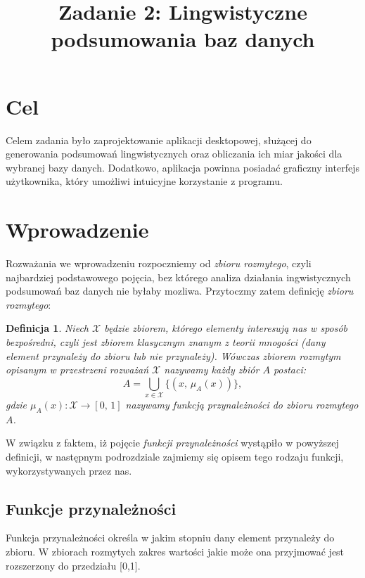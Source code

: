 \documentclass{classrep}
\author{
\studentinfo{Mateusz Walczak}{216911} \and
\studentinfo{Konrad Kajszczak}{216790}
}
\title{Zadanie 2: Lingwistyczne podsumowania baz danych}
\newtheorem{definition}{Definicja}
\begin{document}
\maketitle

\section{Cel}
Celem zadania było zaprojektowanie aplikacji desktopowej, służącej do generowania podsumowań lingwistycznych oraz obliczania ich miar jakości dla wybranej bazy danych. Dodatkowo, aplikacja powinna posiadać graficzny interfejs użytkownika, który umożliwi intuicyjne korzystanie z programu.


\section{Wprowadzenie}
Rozważania we wprowadzeniu rozpoczniemy od \emph{zbioru rozmytego}, czyli najbardziej podstawowego pojęcia, bez którego analiza działania ingwistycznych podsumowań baz danych nie byłaby mozliwa. Przytoczmy zatem definicję \emph{zbioru rozmytego}:

\begin{definition}
Niech \(\mathcal{X}\) będzie zbiorem, którego elementy interesują
nas w sposób bezpośredni, czyli jest zbiorem klasycznym znanym z teorii mnogości (dany element przynależy do zbioru lub nie przynależy).
Wówczas \emph{zbiorem rozmytym opisanym w przestrzeni rozważań \(\mathcal{X}\)}
nazywamy każdy zbiór \(A\) postaci:
\[A = \bigcup_{x \in \mathcal{X}} \{(x,\, \mu_A(x))\},\]
gdzie \(\mu_A(x) : \mathcal{X} \to [0,\,1]\) nazywamy \emph{funkcją
przynależności do zbioru rozmytego \(A\)}.
\end{definition}

W związku z faktem, iż pojęcie \emph{funkcji przynależności} wystąpiło w powyższej definicji, w następnym podrozdziale zajmiemy się opisem tego rodzaju funkcji, wykorzystywanych przez nas.



\subsection{Funkcje przynależności}

Funkcja przynależności określa w jakim stopniu dany element przynależy do zbioru. W zbiorach rozmytych zakres wartości jakie może ona przyjmować jest rozszerzony do przedziału [0,1]. \newline
\end{document}
